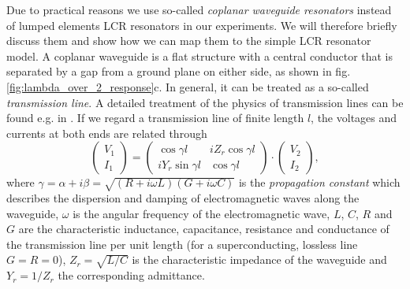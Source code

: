 Due to practical reasons we use so-called {\it coplanar waveguide resonators} instead of lumped elements LCR resonators in our experiments. We will therefore briefly discuss them and show how we can map them to the simple LCR resonator model. A coplanar waveguide is a flat structure with a central conductor that is separated by a gap from a ground plane on either side, as shown in fig. \ref{fig:lambda_over_2_response}c. In general, it can be treated as a so-called {\it transmission line}. A detailed treatment of the physics of transmission lines can be found e.g. in \cite{pozar_microwave_2011}.  If we regard a transmission line of finite length $l$, the voltages and currents at both ends are related through \citep{pozar_microwave_2011}
%
\begin{equation}
\left( \begin{array}{c} V_1 \\ I_1 \end{array}\right) = \left( 
		\begin{array}{cc}
			\cos{\gamma l} & iZ_r \cos{\gamma l} \\
			i Y_r \sin{\gamma l} & \cos{\gamma l}
		\end{array}
		\right) \cdot \left(
		\begin{array}{c}
			V_2 \\ I_2
		\end{array}
		\right), \label{eq:cpw_abcd_matrix}
\end{equation}
%
where $\gamma = \alpha+i\beta = \sqrt{(R+i\omega L)(G+i\omega C)}$ is the {\it propagation constant} which describes the dispersion and damping of electromagnetic waves along the waveguide, $\omega$ is the angular frequency of the electromagnetic wave, $L$, $C$, $R$ and $G$ are the characteristic inductance, capacitance, resistance and conductance of the transmission line per unit length (for a superconducting, lossless line $G=R=0$), $Z_r=\sqrt{L/C}$ is the characteristic impedance of the waveguide and $Y_r=1/Z_r$ the corresponding admittance. 

\smallskip

